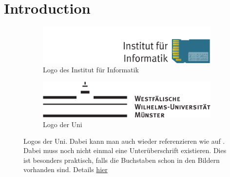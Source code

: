 \chapter{Introduction} 

\label{cha:introduction}


\label{sec:motivation}

\blindtext \cite{Loepmeier:2015TR} \label{example:reference}

\begin{figure}	
	\centering
	\begin{subfigure}[t]{0.45\textwidth}
		\caption{Logo des Institut für Informatik}
		\includegraphics[width=1.0\textwidth]{graphics/cs_logo_nl_blue.pdf}
	\end{subfigure}
	\begin{subfigure}[t]{0.45\textwidth}
		\caption{Logo der Uni}
		\includegraphics[width=1.0\textwidth]{graphics/wwu-logo-neu.pdf}
	\end{subfigure}

	\begin{subfigure}[t]{0.45\textwidth}		
		\label{fig:inner}
	\end{subfigure}
	\begin{subfigure}[t]{0.45\textwidth}
	\end{subfigure}
\caption[Logos der Uni]{Logos der Uni. Dabei kann man auch wieder referenzieren wie auf . Dabei muss noch nicht einmal eine Unterüberschrift existieren. Dies ist besonders praktisch, falls die Buchstaben schon in den Bildern vorhanden sind. Details \href{http://get-software.net/macros/latex/contrib/caption/subcaption.pdf}{hier}
}
\label{fig:meth:bgsub:whole}
\end{figure}
%
%
%

